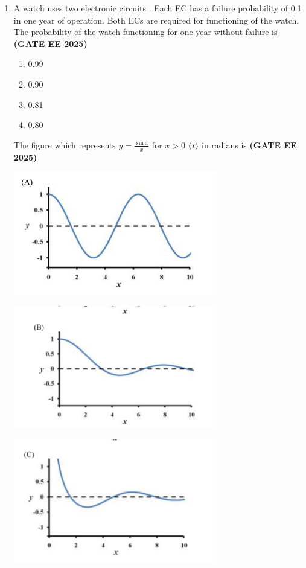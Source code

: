 \documentclass[journal,12pt,onecolumn]{IEEEtran}
\theoremstyle{remark}
\begin{document}
\begin{enumerate}
\item A watch uses two electronic circuits . Each EC has a failure probability of 0.1 in one year of operation. Both ECs are required for functioning of the watch. The probability of the watch functioning for one year without failure is
\hfill \textbf{(GATE EE 2025)} \begin{enumerate}
    \item 0.99
    \item 0.90
    \item 0.81
    \item 0.80
\end{enumerate}


\newpage
The figure which represents $y=\frac{\sin x}{x}$ for $x>0$ $\left(x\right)$ in radians is \hfill \textbf{(GATE EE 2025)}

\begin{center}
\includegraphics[width=0.7\textwidth]{figs/4a.png}
\end{center}

\begin{center}
\includegraphics[width=0.7\textwidth]{figs/4b.png}
\end{center}

\begin{center}
\includegraphics[width=0.7\textwidth]{figs/4c.png}
\end{center}


\end{enumerate}
\end{document}
